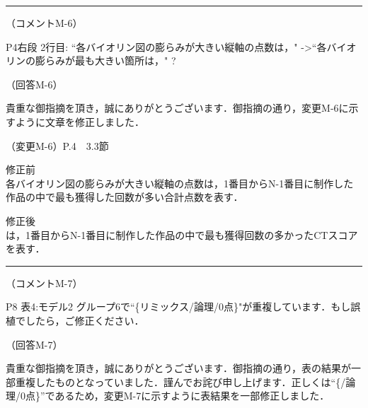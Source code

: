 \documentclass{jarticle} %
\def\subsection#1{ \vspace{1pc} {\gt #1} }
\def\nextans{ \vspace{2pc} \hrule }
\begin{document}
\newpage
\nextans
\subsection{（コメントM-6）}

P4右段 2行目: ``各バイオリン図の膨らみが大きい縦軸の点数は，" -\textgreater  ``各バイオリンの膨らみが最も大きい箇所は，" ?

\subsection{（回答M-6）}

貴重な御指摘を頂き，誠にありがとうございます．御指摘の通り，変更M-6に示すように文章を修正しました．

\subsection{（変更M-6）P.4　3.3節}
\vspace{-0.3cm}
\begin{description}
\item 修正前\\
\phantom{　}
各バイオリン図の膨らみが大きい縦軸の点数は，1番目からN-1番目に制作した作品の中で最も獲得した回数が多い合計点数を表す．
\vspace{-0.3cm}
\item 修正後\\
\phantom{　}
\textcolor{red}{}は，1番目からN-1番目に制作した作品の中で最も獲得回数の多かったCTスコアを表す．
\end{description}

\newpage
\nextans
\subsection{（コメントM-7）}

P8 表4:モデル2 グループ6で``\{リミックス/論理/0点\}"が重複しています．もし誤植でしたら，ご修正ください．

\subsection{（回答M-7）}

貴重な御指摘を頂き，誠にありがとうございます．御指摘の通り，表の結果が一部重複したものとなっていました．謹んでお詫び申し上げます．正しくは``\{/論理/0点\}''であるため，変更M-7に示すように表結果を一部修正しました．
\end{document}

